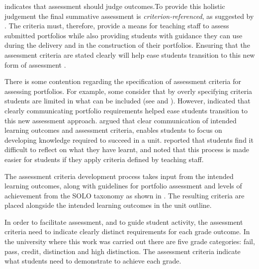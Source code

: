  indicates that assessment should judge outcomes.To provide this holistic judgement the final summative assessment is \emph{criterion-referenced}, as suggested by \citet{Biggs:1997}. The criteria must, therefore, provide a means for teaching staff to assess submitted portfolios while also providing students with guidance they can use during the delivery and in the construction of their portfolios. Ensuring that the assessment criteria are stated clearly will help ease students transition to this new form of assessment \cite{Smith:2001}.

There is some contention regarding the specification of assessment criteria for assessing portfolios. For example, some consider that by overly specifying criteria students are limited in what can be included (see \citet{Driessen:2005} and \citet{Tigelaar:2007}). 
However, \citet{Smith:2001} indicated that clearly communicating portfolio requirements helped ease students transition to this new assessment approach. \citet{Allan:1996} argued that clear communication of intended learning outcomes and assessment criteria, enables students to focus on developing knowledge required to succeed in a unit. \citet{Thorpe:2000} reported that students find it difficult to reflect on what they have learnt, and noted that this process is made easier for students if they apply criteria defined by teaching staff.

The assessment criteria development process takes input from the intended learning outcomes, along with guidelines for portfolio assessment \cite{Biggs:2007} and levels of achievement from the SOLO taxonomy \cite{Biggs:1982} as shown in . The resulting criteria are placed alongside the intended learning outcomes in the unit outline.

In order to facilitate assessment, and to guide student activity, the assessment criteria need to indicate clearly distinct requirements for each grade outcome. In the university where this work was carried out there are five grade categories: fail, pass, credit, distinction and high distinction. The assessment criteria indicate what students need to demonstrate to achieve each grade. 

